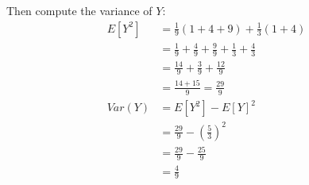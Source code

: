 Then compute the variance of $Y$:
\begin{align*}
	E[Y^2] & = \frac{1}{9}(1 + 4 + 9) + \frac{1}{3}(1+4)                           \\
	       & = \frac{1}{9} + \frac{4}{9} + \frac{9}{9} + \frac{1}{3} + \frac{4}{3} \\
	       & = \frac{14}{9} + \frac{3}{9} + \frac{12}{9}                           \\
	       & = \frac{14+15}{9} = \frac{29}{9}                                      \\
	Var(Y) & = E[Y^2] - E[Y]^2                                                     \\
	       & = \frac{29}{9} - \left(\frac{5}{3}\right)^2                           \\
	       & = \frac{29}{9} - \frac{25}{9}                                         \\
	       & = \frac{4}{9}                                                         \\
\end{align*}
